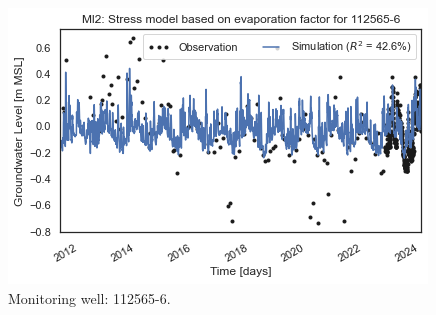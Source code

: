\begin{figure}[htbp]
\begin{minipage}{0.32\textwidth}
        \includegraphics[width=\linewidth]{frontmatter/Rozenburg-fig/1125656(2).png}
        \caption{Monitoring well: 112565-6.}
        \label{fig:112565-6}
    \end{minipage}
\end{figure}
